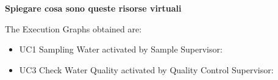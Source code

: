 \textbf{Spiegare cosa sono queste risorse virtuali}\\
\newpage

The Execution Graphs obtained are:

\begin{itemize}
\item UC1 Sampling Water activated by Sample Supervisor:
	\bigskip
	\bigskip
	\begin{center}
	\end{center}
	\bigskip
\newpage
\item UC3 Check Water Quality activated by Quality Control Supervisor:
	\bigskip
	\bigskip
	\bigskip
	\bigskip
	\begin{center}
	\end{center}
	\bigskip
\end{itemize}



